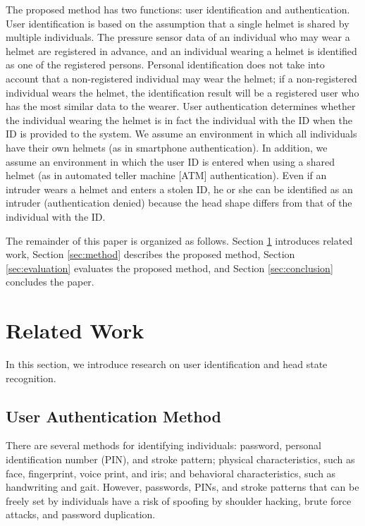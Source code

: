 \documentclass[english,preprint,JIP]{ipsj}
\begin{document}
The proposed method has two functions: user identification and authentication. User identification is based on the assumption that a single helmet is shared by multiple individuals. The pressure sensor data of an individual who may wear a helmet are registered in advance, and an individual wearing a helmet is identified as one of the registered persons. Personal identification does not take into account that a non-registered individual may wear the helmet; if a non-registered individual wears the helmet, the identification result will be a registered user who has the most similar data to the wearer. User authentication determines whether the individual wearing the helmet is in fact the individual with the ID when the ID is provided to the system. We assume an environment in which all individuals have their own helmets (as in smartphone authentication). In addition, we assume an environment in which the user ID is entered when using a shared helmet (as in automated teller machine [ATM] authentication). Even if an intruder wears a helmet and enters a stolen ID, he or she can be identified as an intruder (authentication denied) because the head shape differs from that of the individual with the ID.\par

The remainder of this paper is organized as follows. Section \ref{sec:related} introduces related work, Section \ref{sec:method} describes the proposed method, Section \ref{sec:evaluation} evaluates the proposed method, and Section \ref{sec:conclusion} concludes the paper.



\section{Related Work}
\label{sec:related}
In this section, we introduce research on user identification and head state recognition.


\subsection{User Authentication Method}
There are several methods for identifying individuals: password, personal identification number (PIN), and stroke pattern; physical characteristics, such as face, fingerprint, voice print, and iris; and behavioral characteristics, such as handwriting and gait. However, passwords, PINs, and stroke patterns that can be freely set by individuals have a risk of spoofing by shoulder hacking, brute force attacks, and password duplication.\par
\end{document}
